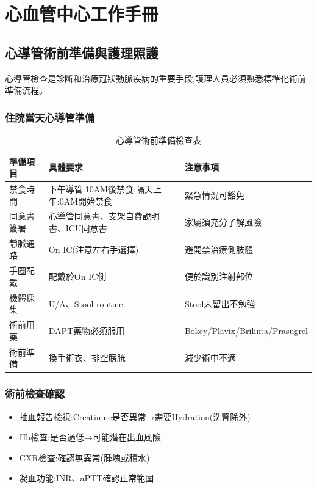 \documentclass[12pt,a4paper]{article}
\begin{document}
\section{心血管中心工作手冊}

\subsection{心導管術前準備與護理照護}
心導管檢查是診斷和治療冠狀動脈疾病的重要手段,護理人員必須熟悉標準化術前準備流程。

\subsubsection{住院當天心導管準備}
\begin{table}[h]
    \centering
    \caption{心導管術前準備檢查表}
    \begin{tabular}{p{4cm} p{8cm} p{4cm}}
        \toprule
        \textbf{準備項目} & \textbf{具體要求} & \textbf{注意事項} \\
        \midrule
        禁食時間 & 下午導管:10AM後禁食;隔天上午:0AM開始禁食 & 緊急情況可豁免 \\
        同意書簽署 & 心導管同意書、支架自費說明書、ICU同意書 & 家屬須充分了解風險 \\
        靜脈通路 & On IC(注意左右手選擇) & 避開禁治療側肢體 \\
        手圈配戴 & 配戴於On IC側 & 便於識別注射部位 \\
        檢體採集 & U/A、Stool routine & Stool未留出不勉強 \\
        術前用藥 & DAPT藥物必須服用 & Bokey/Plavix/Brilinta/Prasugrel \\
        術前準備 & 換手術衣、排空膀胱 & 減少術中不適 \\
        \bottomrule
    \end{tabular}
\end{table}

\subsubsection{術前檢查確認}
\begin{itemize}[nosep]
    \item 抽血報告檢視:Creatinine是否異常→需要Hydration(洗腎除外)
    \item Hb檢查:是否過低→可能潛在出血風險
    \item CXR檢查:確認無異常(腫塊或積水)
    \item 凝血功能:INR、aPTT確認正常範圍
\end{itemize}
\end{document}
